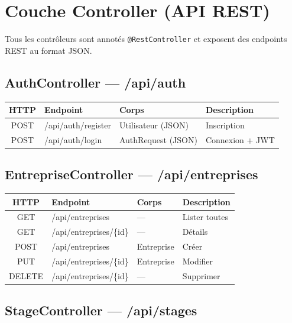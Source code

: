 \documentclass[12pt,a4paper]{report}
\begin{document}
\chapter{Couche Controller (API REST)}

Tous les contrôleurs sont annotés \texttt{@RestController} et exposent des endpoints REST au format JSON.

\section{AuthController --- /api/auth}

\begin{table}[H]
\centering
\begin{tabular}{|c|l|l|p{4cm}|}
\hline
\textbf{HTTP} & \textbf{Endpoint} & \textbf{Corps} & \textbf{Description} \\ \hline
POST & /api/auth/register & Utilisateur (JSON) & Inscription \\ \hline
POST & /api/auth/login & AuthRequest (JSON) & Connexion + JWT \\ \hline
\end{tabular}
\end{table}

\section{EntrepriseController --- /api/entreprises}

\begin{table}[H]
\centering
\begin{tabular}{|c|l|l|p{4cm}|}
\hline
\textbf{HTTP} & \textbf{Endpoint} & \textbf{Corps} & \textbf{Description} \\ \hline
GET & /api/entreprises & --- & Lister toutes \\ \hline
GET & /api/entreprises/\{id\} & --- & Détails \\ \hline
POST & /api/entreprises & Entreprise & Créer \\ \hline
PUT & /api/entreprises/\{id\} & Entreprise & Modifier \\ \hline
DELETE & /api/entreprises/\{id\} & --- & Supprimer \\ \hline
\end{tabular}
\end{table}

\section{StageController --- /api/stages}
\end{document}
